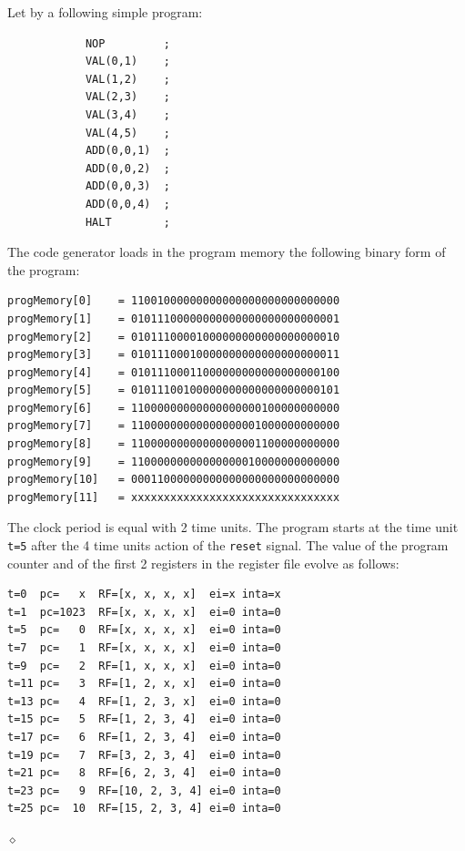 \begin{exemplu}\label{exADD}
Let by a following simple program:
{\small
\begin{verbatim}
            NOP         ;
            VAL(0,1)    ;
            VAL(1,2)    ;
            VAL(2,3)    ;
            VAL(3,4)    ;
            VAL(4,5)    ;
            ADD(0,0,1)  ;
            ADD(0,0,2)  ;
            ADD(0,0,3)  ;
            ADD(0,0,4)  ;
            HALT        ;
\end{verbatim}
}
The code generator loads in the program memory the following binary form of the program:
{\small
\begin{verbatim}
progMemory[0]    = 11001000000000000000000000000000
progMemory[1]    = 01011100000000000000000000000001
progMemory[2]    = 01011100001000000000000000000010
progMemory[3]    = 01011100010000000000000000000011
progMemory[4]    = 01011100011000000000000000000100
progMemory[5]    = 01011100100000000000000000000101
progMemory[6]    = 11000000000000000000100000000000
progMemory[7]    = 11000000000000000001000000000000
progMemory[8]    = 11000000000000000001100000000000
progMemory[9]    = 11000000000000000010000000000000
progMemory[10] 	 = 00011000000000000000000000000000
progMemory[11] 	 = xxxxxxxxxxxxxxxxxxxxxxxxxxxxxxxx
\end{verbatim}
}
The clock period is equal with 2 time units. The program starts at the time unit {\tt t=5} after the 4 time units action of the {\tt reset} signal.
The value of the program counter and of the first 2 registers in the register file evolve as follows:
{\small
\begin{verbatim}
t=0  pc=   x  RF=[x, x, x, x]  ei=x inta=x
t=1  pc=1023  RF=[x, x, x, x]  ei=0 inta=0
t=5  pc=   0  RF=[x, x, x, x]  ei=0 inta=0
t=7  pc=   1  RF=[x, x, x, x]  ei=0 inta=0
t=9  pc=   2  RF=[1, x, x, x]  ei=0 inta=0
t=11 pc=   3  RF=[1, 2, x, x]  ei=0 inta=0
t=13 pc=   4  RF=[1, 2, 3, x]  ei=0 inta=0
t=15 pc=   5  RF=[1, 2, 3, 4]  ei=0 inta=0
t=17 pc=   6  RF=[1, 2, 3, 4]  ei=0 inta=0
t=19 pc=   7  RF=[3, 2, 3, 4]  ei=0 inta=0
t=21 pc=   8  RF=[6, 2, 3, 4]  ei=0 inta=0
t=23 pc=   9  RF=[10, 2, 3, 4] ei=0 inta=0
t=25 pc=  10  RF=[15, 2, 3, 4] ei=0 inta=0
\end{verbatim}
}


$\diamond$
\end{exemplu}

